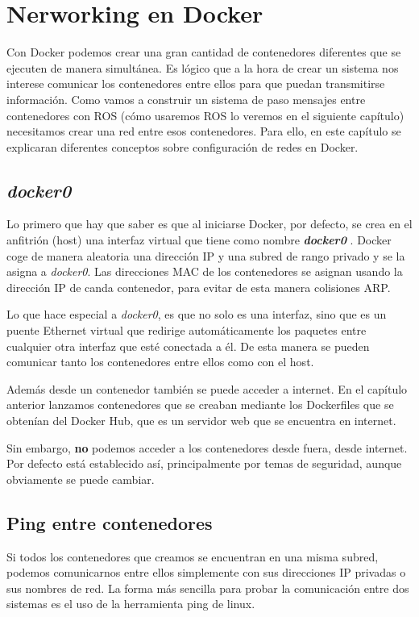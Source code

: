 \chapter{Nerworking en Docker}
Con Docker podemos crear una gran cantidad de contenedores diferentes que se ejecuten de manera simultánea. Es lógico que a la hora de crear un sistema nos interese comunicar los contenedores entre ellos para que puedan transmitirse información. Como vamos a construir un sistema de paso mensajes entre contenedores con ROS (cómo usaremos ROS lo veremos en el siguiente capítulo) necesitamos crear una red entre esos contenedores. Para ello, en este capítulo se explicaran diferentes conceptos sobre configuración de redes en Docker.

	\section{\textit{docker0}}
	Lo primero que hay que saber es que al iniciarse Docker, por defecto, se crea en el anfitrión (host) una interfaz virtual que tiene como nombre \textbf{\emph{docker0}} \cite{docker-network-advanced}. Docker coge de manera aleatoria una dirección IP y una subred de rango privado y se la asigna a \emph{docker0}. Las direcciones MAC de los contenedores se asignan usando la dirección IP de canda contenedor, para evitar de esta manera colisiones ARP.
	
	Lo que hace especial a \emph{docker0}, es que no solo es una interfaz, sino que es un puente Ethernet virtual que redirige automáticamente los paquetes entre cualquier otra interfaz que esté conectada a él. De esta manera se pueden comunicar tanto los contenedores entre ellos como con el host.
	
	Además desde un contenedor también se puede acceder a internet. En el capítulo anterior lanzamos contenedores que se creaban mediante los Dockerfiles que se obtenían del Docker Hub, que es un servidor web que se encuentra en internet. 
	
	Sin embargo, \textbf{no} podemos acceder a los contenedores desde fuera, desde internet. Por defecto está 
	establecido así, principalmente por temas de seguridad, aunque obviamente se puede cambiar.
	
	\section{Ping entre contenedores}
	Si todos los contenedores que creamos se encuentran en una misma subred, podemos comunicarnos entre ellos simplemente con sus direcciones IP privadas o sus nombres de red. La forma más sencilla para probar la comunicación entre dos sistemas es el uso de la herramienta ping de linux.
	
